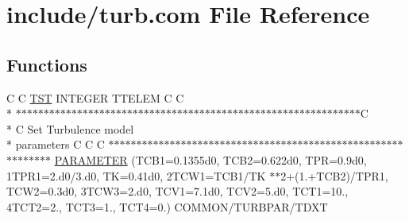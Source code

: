 \hypertarget{home_2abonfi_2_c_f_d__codes_2_eul_f_s_83_84_2include_2turb_8com}{\section{include/turb.com File Reference}
\label{home_2abonfi_2_c_f_d__codes_2_eul_f_s_83_84_2include_2turb_8com}
}
\subsection*{Functions}
\begin{DoxyCompactItemize}
\item 
C C \hyperlink{msa20_2home_2abonfi_2_c_f_d__codes_2_eul_f_s_83_82_83_2include_2turb_8com_a677fc6bb107acfd381357f761464b300}{T\-S\-T} I\-N\-T\-E\-G\-E\-R T\-T\-E\-L\-E\-M C C \\*
$\ast$$\ast$$\ast$$\ast$$\ast$$\ast$$\ast$$\ast$$\ast$$\ast$$\ast$$\ast$$\ast$$\ast$$\ast$$\ast$$\ast$$\ast$$\ast$$\ast$$\ast$$\ast$$\ast$$\ast$$\ast$$\ast$$\ast$$\ast$$\ast$$\ast$$\ast$$\ast$$\ast$$\ast$$\ast$$\ast$$\ast$$\ast$$\ast$$\ast$$\ast$$\ast$$\ast$$\ast$$\ast$$\ast$$\ast$$\ast$$\ast$$\ast$$\ast$$\ast$$\ast$$\ast$$\ast$$\ast$$\ast$$\ast$$\ast$$\ast$$\ast$$\ast$C \\*
C Set Turbulence model \\*
parameters C C C $\ast$$\ast$$\ast$$\ast$$\ast$$\ast$$\ast$$\ast$$\ast$$\ast$$\ast$$\ast$$\ast$$\ast$$\ast$$\ast$$\ast$$\ast$$\ast$$\ast$$\ast$$\ast$$\ast$$\ast$$\ast$$\ast$$\ast$$\ast$$\ast$$\ast$$\ast$$\ast$$\ast$$\ast$$\ast$$\ast$$\ast$$\ast$$\ast$$\ast$$\ast$$\ast$$\ast$$\ast$$\ast$$\ast$$\ast$$\ast$$\ast$$\ast$$\ast$$\ast$$\ast$$\ast$$\ast$$\ast$$\ast$$\ast$$\ast$$\ast$$\ast$ \hyperlink{home_2abonfi_2_c_f_d__codes_2_eul_f_s_83_84_2include_2turb_8com_a389bbfe938bae9bde27ca4e66428f7d1}{P\-A\-R\-A\-M\-E\-T\-E\-R} (T\-C\-B1=0.\-1355d0, T\-C\-B2=0.\-622d0, T\-P\-R=0.\-9d0, 1\-T\-P\-R1=2.\-d0/3.\-d0, T\-K=0.\-41d0, 2\-T\-C\-W1=\-T\-C\-B1/\-T\-K $\ast$$\ast$2+(1.+\-T\-C\-B2)/\-T\-P\-R1, T\-C\-W2=0.\-3d0, 3\-T\-C\-W3=2.\-d0, T\-C\-V1=7.\-1d0, T\-C\-V2=5.\-d0, T\-C\-T1=10., 4\-T\-C\-T2=2., T\-C\-T3=1., T\-C\-T4=0.) C\-O\-M\-M\-O\-N/\-T\-U\-R\-B\-P\-A\-R/\-T\-D\-X\-T
\end{DoxyCompactItemize}
